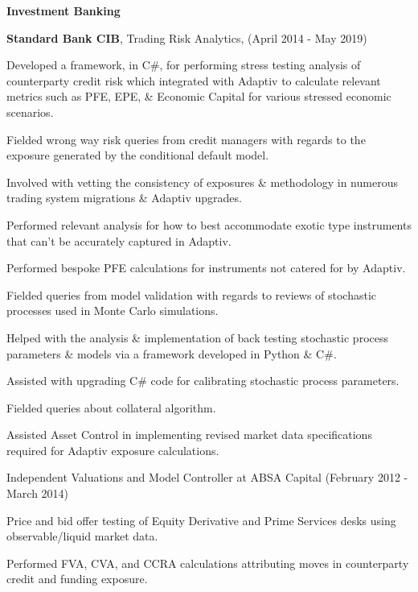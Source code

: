\documentclass[11pt]{article}
\newenvironment{outerlist}[1][\enskip\textbullet]%
        {\begin{itemize}[#1]}{\end{itemize}%
         \vspace{-.6\baselineskip}}
\newenvironment{innerlist}[1][\enskip\textbullet]%
        {\begin{compactitem}[#1]}{\end{compactitem}}
\newcommand{\blankline}{\quad\pagebreak[2]}
\begin{document}
\textbf{Investment Banking}
%
\blankline
\begin{outerlist}
	\item[] \textbf{\textcolor{customaqua}{Standard Bank CIB}}, Trading Risk Analytics, (April 2014 - May 2019)
					\begin{innerlist}
						\item Developed a framework, in C\#, for performing stress testing analysis of counterparty credit risk which integrated with Adaptiv to calculate relevant metrics such as PFE, EPE, \& Economic Capital for various stressed economic scenarios.
						\item Fielded wrong way risk queries from credit managers with regards to the exposure generated by the conditional default model.
						\item Involved with vetting the consistency of exposures \& methodology in numerous trading system migrations \& Adaptiv upgrades.
						\item Performed relevant analysis for how to best accommodate exotic type instruments that can't be accurately captured in Adaptiv.
						\item Performed bespoke PFE calculations for instruments not catered for by Adaptiv.
						\item Fielded queries from model validation with regards to reviews of stochastic processes used in Monte Carlo simulations.
						\item Helped with the analysis \& implementation of back testing stochastic process parameters \& models via a framework developed in Python \& C\#.
						\item Assisted with upgrading C\# code for calibrating stochastic process parameters. 
						\item Fielded queries about collateral algorithm.
						\item Assisted Asset Control in implementing revised market data specifications required for Adaptiv exposure calculations.
					\end{innerlist}
					\item[] Independent Valuations and Model Controller at ABSA Capital (February 2012 - March 2014)
					\begin{innerlist}
						\item Price and bid offer testing of Equity Derivative and Prime Services desks using observable/liquid market data.
						\item Performed FVA, CVA, and CCRA calculations attributing moves in counterparty credit and funding exposure. 

\end{innerlist}
\end{outerlist}
\end{document}
